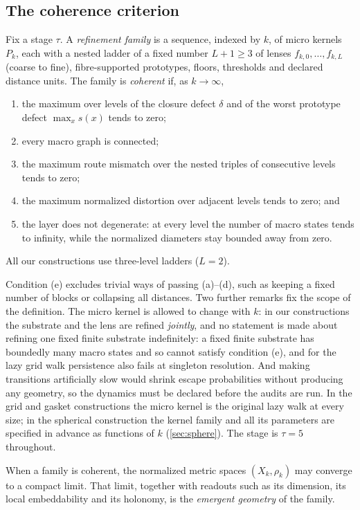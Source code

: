 \subsection{The coherence criterion}

\begin{definition}
\label{def:coherence}
Fix a stage $\tau$.
A \emph{refinement family} is a sequence, indexed by $k$, of micro kernels $P_k$, each with a nested ladder of a fixed number $L+1\ge3$ of lenses $f_{k,0},\dots,f_{k,L}$ (coarse to fine), fibre-supported prototypes, floors, thresholds and declared distance units.
The family is \emph{coherent} if, as $k\to\infty$,
\begin{enumerate}[label=(\alph*)]
\item the maximum over levels of the closure defect $\delta$ and of the worst prototype defect $\max_x s(x)$ tends to zero;
\item every macro graph is connected;
\item the maximum route mismatch over the nested triples of consecutive levels tends to zero;
\item the maximum normalized distortion over adjacent levels tends to zero; and
\item the layer does not degenerate: at every level the number of macro states tends to infinity, while the normalized diameters stay bounded away from zero.
\end{enumerate}
All our constructions use three-level ladders ($L=2$).
\end{definition}

Condition (e) excludes trivial ways of passing (a)--(d), such as keeping a fixed number of blocks or collapsing all distances.
Two further remarks fix the scope of the definition.
The micro kernel is allowed to change with $k$: in our constructions the substrate and the lens are refined \emph{jointly}, and no statement is made about refining one fixed finite substrate indefinitely: a fixed finite substrate has boundedly many macro states and so cannot satisfy condition (e), and for the lazy grid walk persistence also fails at singleton resolution.
And making transitions artificially slow would shrink escape probabilities without producing any geometry, so the dynamics must be declared before the audits are run.
In the grid and gasket constructions the micro kernel is the original lazy walk at every size; in the spherical construction the kernel family and all its parameters are specified in advance as functions of $k$ (\cref{sec:sphere}).
The stage is $\tau=5$ throughout.

When a family is coherent, the normalized metric spaces $(X_k,\rho_k)$ may converge to a compact limit.
That limit, together with readouts such as its dimension, its local embeddability and its holonomy, is the \emph{emergent geometry} of the family.
